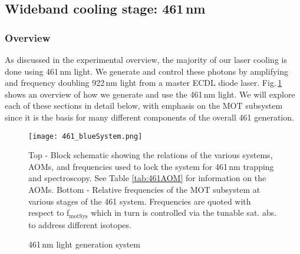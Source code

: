 \subsection{Wideband cooling stage: 461\,nm} \label{ssec:461sys}
\subsubsection{Overview}
As discussed in the experimental overview, the majority of our laser cooling is done using 461\,nm light. 
We generate and control these photons by amplifying and frequency doubling 922\,nm light from a master ECDL diode laser. 
Fig.\,\ref{fig:461blockSys} shows an overview of how we generate and use the 461\,nm light.
We will explore each of these sections in detail below, with emphasis on the MOT subsystem since it is the basis for many different components of the overall 461 generation.
	\begin{figure}
		\centerline{
		\texttt{[image: 461\_blueSystem.png]}}
		\caption{461\,nm light generation system}{Top - Block schematic showing the relations of the various systems, AOMs, and frequencies used to lock the system for 461\,nm trapping and spectroscopy. See Table \ref{tab:461AOM} for information on the AOMs. Bottom - Relative frequencies of the MOT subsystem at various stages of the 461 system. Frequencies are quoted with respect to f$_{\text{motSys}}$ which in turn is controlled via the tunable sat. abs. to address different isotopes.}
		\label{fig:461blockSys}
	\end{figure} 

